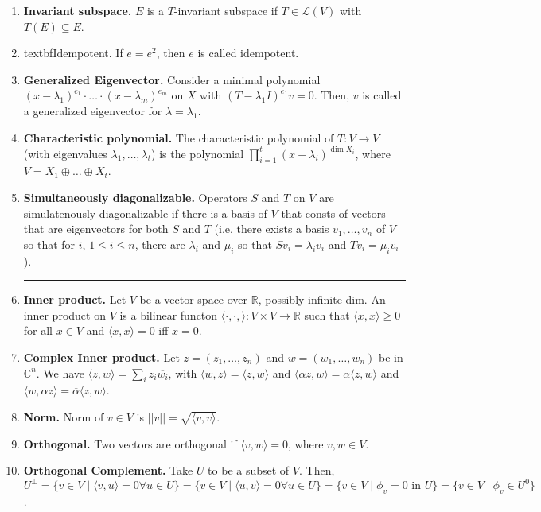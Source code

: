 \begin{enumerate}
	\item \textbf{Invariant subspace. } $E$ is a $T$-invariant subspace if $T \in \mathscr{L}(V)$ with $T(E) \subseteq E$. 
	\item textbf{Idempotent. } If $e = e^2$, then $e$ is called idempotent. 
	\item \textbf{Generalized Eigenvector. } Consider a minimal polynomial $(x-\lambda_1)^{e_1} \cdot \dots \cdot (x-\lambda_m)^{e_m}$ on $X$ with $(T-\lambda_1I)^{e_1}v = 0$. Then, $v$ is called a generalized eigenvector for $\lambda = \lambda_1$. 
	\item \textbf{Characteristic polynomial. } The characteristic polynomial of $T: V \to V$ (with eigenvalues $\lambda_1,\dots,\lambda_t$) is the polynomial $\prod_{i=1}^{t} (x-\lambda_i)^{\dim X_i}$, where $V = X_1 \oplus \dots \oplus X_t$. 
	\item \textbf{Simultaneously diagonalizable. } Operators $S$ and $T$ on $V$ are simulatenously diagonalizable if there is a basis of $V$ that consts of vectors that are eigenvectors for both $S$ and $T$ (i.e. there exists a basis $v_1,\dots,v_n$ of $V$ so that for $i$, $1 \leq i \leq n$, there are $\lambda_i$ and $\mu_i$ so that $Sv_i = \lambda_iv_i$ and $Tv_i = \mu_iv_i$). 
	\begin{center}
		\hrule
	\end{center}
	\item \textbf{Inner product. } Let $V$ be a vector space over $\mathbb{R}$, possibly infinite-dim. An inner product on $V$ is a bilinear functon $\langle \cdot, \cdot, \rangle: V \times V \to \mathbb{R}$ such that $\langle x, x \rangle \geq 0$ for all $x \in V$ and $\langle x, x \rangle = 0$ iff $x =0$. 
	\item \textbf{Complex Inner product. } Let $z=(z_1,\dots,z_n)$ and $w=(w_1,\dots,w_n)$ be in $\mathbb{C}^n$. We have $\langle z, w \rangle = \sum_{i} z_i \overline{w_i}$, with $\langle w, z \rangle = \overline{\langle z, w \rangle}$ and $\langle \alpha z, w \rangle = \alpha \langle z, w \rangle$ and $\langle w, \alpha z \rangle = \overline{\alpha}\langle z, w \rangle$. 
	\item \textbf{Norm. } Norm of $v \in V$ is $||v|| = \sqrt{\langle v, v \rangle}$. 
	\item \textbf{Orthogonal. } Two vectors are orthogonal if $\langle v,w \rangle = 0$, where $v,w \in V$. 
	\item \textbf{Orthogonal Complement. } Take $U$ to be a subset of $V$. Then, $U^\perp = \{v \in V \mid \langle v,u \rangle = 0 \forall u \in U\} = \{v \in V \mid \langle u,v \rangle = 0 \forall u \in U\} = \{v \in V \mid \phi_v = 0 \textrm{ in } U\} = \{v \in V \mid \phi_v \in U^0\}$. 

\end{enumerate}
